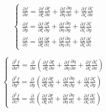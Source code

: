 \documentclass
[
a4paper,                      %
twoside,					  %
12pt,                         %
abstract,		      %
fleqn,                        %
]
{scrartcl} %
\begin{document}
\begin{equation}
\begin{cases}
\frac{\partial f}{\partial x}=\frac{\partial f}{\partial\xi}\frac{\partial\xi}{\partial x}+\frac{\partial f}{\partial\eta}\frac{\partial\eta}{\partial x}+\frac{\partial f}{\partial\zeta}\frac{\partial\zeta}{\partial x}\\[5pt]
\frac{\partial f}{\partial y}=\frac{\partial f}{\partial\xi}\frac{\partial\xi}{\partial y}+\frac{\partial f}{\partial\eta}\frac{\partial\eta}{\partial y}+\frac{\partial f}{\partial\zeta}\frac{\partial\zeta}{\partial y}\\[5pt]
\frac{\partial f}{\partial z}=\frac{\partial f}{\partial\xi}\frac{\partial\xi}{\partial z}+\frac{\partial f}{\partial\eta}\frac{\partial\eta}{\partial z}+\frac{\partial f}{\partial\zeta}\frac{\partial\zeta}{\partial z}
\end{cases}
\end{equation}

\begin{equation}
\begin{cases}
\frac{\partial^{2} f}{\partial x^{2}}=\frac{\partial}{\partial x}\left(\frac{\partial f}{\partial\xi}\frac{\partial\xi}{\partial x}+\frac{\partial f}{\partial\eta}\frac{\partial\eta}{\partial x}+\frac{\partial f}{\partial\zeta}\frac{\partial\zeta}{\partial x}\right)\\[5pt]
\frac{\partial^{2} f}{\partial y^{2}}=\frac{\partial}{\partial y}\left(\frac{\partial f}{\partial\xi}\frac{\partial\xi}{\partial y}+\frac{\partial f}{\partial\eta}\frac{\partial\eta}{\partial y}+\frac{\partial f}{\partial\zeta}\frac{\partial\zeta}{\partial y}\right)\\[5pt]
\frac{\partial^{2} f}{\partial z^{2}}=\frac{\partial}{\partial z}\left(\frac{\partial f}{\partial\xi}\frac{\partial\xi}{\partial z}+\frac{\partial f}{\partial\eta}\frac{\partial\eta}{\partial z}+\frac{\partial f}{\partial\zeta}\frac{\partial\zeta}{\partial z}\right)
\end{cases}
\end{equation}
\end{document}
